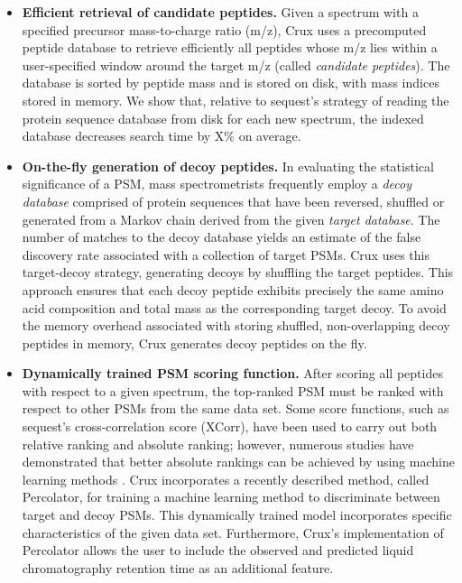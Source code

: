\documentclass{bioinfo}
\renewcommand{\cite}{\citep}
\begin{document}
\begin{itemize}

\item {\bf Efficient retrieval of candidate peptides.}  Given a
  spectrum with a specified precursor mass-to-charge ratio (m/z), Crux
  uses a precomputed peptide database to retrieve efficiently all
  peptides whose m/z lies within a user-specified window around the
  target m/z (called {\em candidate peptides}).  The database is
  sorted by peptide mass and is stored on disk, with mass indices
  stored in memory.  We show that, relative to {\sc sequest}'s strategy of
  reading the protein sequence database from disk for each new
  spectrum, the indexed database decreases search time by X\% on
  average.

\item {\bf On-the-fly generation of decoy peptides.}  In evaluating
  the statistical significance of a PSM, mass spectrometrists
  frequently employ a {\em decoy database} comprised of protein
  sequences that have been reversed, shuffled or generated from a
  Markov chain derived from the given {\em target database}.  The
  number of matches to the decoy database yields an estimate of the
  false discovery rate associated with a collection of target PSMs.
  Crux uses this target-decoy strategy, generating decoys by shuffling
  the target peptides.  This approach ensures that each decoy peptide
  exhibits precisely the same amino acid composition and total mass as
  the corresponding target decoy.  To avoid the memory overhead
  associated with storing shuffled, non-overlapping decoy peptides in
  memory, Crux generates decoy peptides on the fly.

\item {\bf Dynamically trained PSM scoring function.}  After scoring
  all peptides with respect to a given spectrum, the top-ranked PSM
  must be ranked with respect to other PSMs from the same data set.
  Some score functions, such as {\sc sequest}'s cross-correlation score
  (XCorr), have been used to carry out both relative ranking and
  absolute ranking; however, numerous studies have demonstrated that
  better absolute rankings can be achieved by using machine learning
  methods \cite{keller:empirical, anderson:new, elias:intensity,
  kall:semi-supervised}.  Crux incorporates a recently described
  method, called Percolator, for training a machine learning method to
  discriminate between target and decoy PSMs.  This dynamically
  trained model incorporates specific characteristics of the given
  data set.  Furthermore, Crux's implementation of Percolator allows
  the user to include the observed and predicted liquid chromatography
  retention time \cite{klammer:effect} as an additional feature.


\end{itemize}
\end{document}
